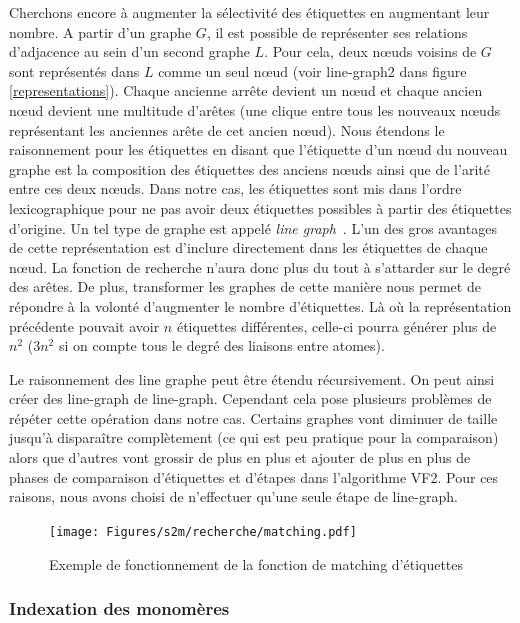 Cherchons encore à augmenter la sélectivité des étiquettes en augmentant leur nombre.
A partir d'un graphe $G$, il est possible de représenter ses relations d'adjacence au sein d'un second graphe $L$.
Pour cela, deux n\oe{}uds voisins de $G$ sont représentés dans $L$ comme un seul n\oe{}ud (voir line-graph2 dans figure \ref{representations}).
Chaque ancienne arrête devient un n\oe{}ud et chaque ancien n\oe{}ud devient une multitude d'arêtes (une clique entre tous les nouveaux n\oe{}uds représentant les anciennes arête de cet ancien n\oe{}ud).
Nous étendons le raisonnement pour les étiquettes en disant que l'étiquette d'un n\oe{}ud du nouveau graphe est la composition des étiquettes des anciens n\oe{}uds ainsi que de l'arité entre ces deux n\oe{}uds.
Dans notre cas, les étiquettes sont mis dans l'ordre lexicographique pour ne pas avoir deux étiquettes possibles à partir des étiquettes d'origine.
Un tel type de graphe est appelé \textit{line graph}~\cite{orlin_line-digraphs_1978}.
L'un des gros avantages de cette représentation est d'inclure directement dans les étiquettes de chaque n\oe{}ud.
La fonction de recherche n'aura donc plus du tout à s'attarder sur le degré des arêtes.
De plus, transformer les graphes de cette manière nous permet de répondre à la volonté d'augmenter le nombre d'étiquettes.
Là où la représentation précédente pouvait avoir $n$ étiquettes différentes, celle-ci pourra générer plus de $n^2$ ($3n^2$ si on compte tous le degré des liaisons entre atomes).

Le raisonnement des line graphe peut être étendu récursivement.
On peut ainsi créer des line-graph de line-graph.
Cependant cela pose plusieurs problèmes de répéter cette opération dans notre cas.
Certains graphes vont diminuer de taille jusqu'à disparaître complètement (ce qui est peu pratique pour la comparaison) alors que d'autres vont grossir de plus en plus et ajouter de plus en plus de phases de comparaison d'étiquettes et d'étapes dans l'algorithme VF2.
Pour ces raisons, nous avons choisi de n'effectuer qu'une seule étape de line-graph.

\begin{figure}[!ht]
  \texttt{[image: Figures/s2m/recherche/matching.pdf]}
  \caption{\label{label_matching}Exemple de fonctionnement de la fonction de matching d'étiquettes}
\end{figure}

\subsubsection{Indexation des monomères}

